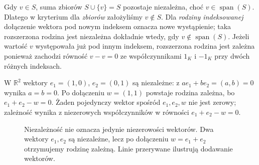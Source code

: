 \begin{uwaga}
\label{rem:lin-zbior-rodzina}
Gdy \(v\in S\), suma zbiorów \(S\cup\{v\}=S\)
pozostaje niezależna, choć \(v\in\operatorname{span}(S)\).
Dlatego w kryterium dla \emph{zbiorów}
założyliśmy \(v\notin S\).
Dla \emph{rodziny indeksowanej} dołączenie wektora
pod nowym indeksem oznacza nowe wystąpienie;
taka rozszerzona rodzina jest niezależna
dokładnie wtedy, gdy \(v\notin\operatorname{span}(S)\).
Jeżeli wartość \(v\) występowała już pod innym
indeksem, rozszerzona rodzina jest zależna
ponieważ zachodzi równość \(v-v=0\)
ze współczynnikami \(1_K\) i \(-1_K\)
przy dwóch różnych indeksach.
\end{uwaga}

\begin{przyklad}
\label{prz:lin-niezaleznosc-r2}
W \(\mathbb R^2\) wektory \(e_1=(1,0)\), \(e_2=(0,1)\)
są niezależne: z \(ae_1+be_2=(a,b)=0\)
wynika \(a=b=0\).
Po dołączeniu \(w=(1,1)\) powstaje rodzina zależna,
bo \(e_1+e_2-w=0\). Żaden pojedynczy wektor
spośród \(e_1,e_2,w\) nie jest zerowy; zależność
wynika z niezerowych współczynników
w równości \(e_1+e_2-w=0\).
\end{przyklad}

\begin{figure}[!htbp]
\centering
{}
\caption{Niezależność nie oznacza jedynie niezerowości wektorów.
Dwa wektory \(e_1,e_2\) są niezależne, lecz po dołączeniu
\(w=e_1+e_2\) otrzymujemy rodzinę zależną.
Linie przerywane ilustrują dodawanie wektorów.}
\label{fig:lin-niezaleznosc-r2}
\end{figure}


